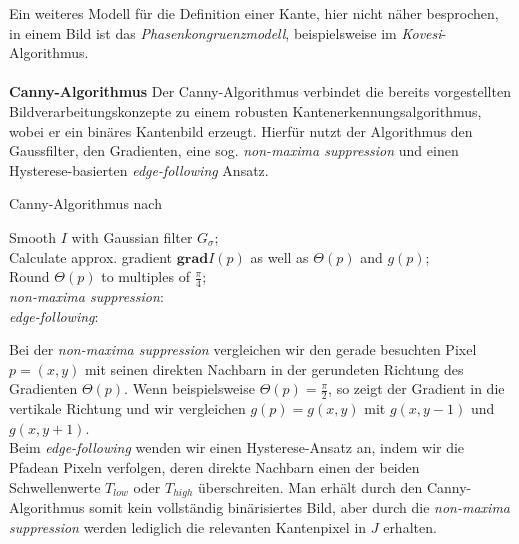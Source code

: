 Ein weiteres Modell für die Definition einer Kante, hier nicht näher besprochen, in einem Bild ist das \textit{Phasenkongruenzmodell}, beispielsweise im \textit{Kovesi}-Algorithmus\cite[S.\.79ff.]{Klette14}.
\\
\\
\textbf{Canny-Algorithmus} Der Canny-Algorithmus verbindet die bereits vorgestellten Bildverarbeitungskonzepte zu einem robusten Kantenerkennungsalgorithmus, wobei er ein binäres Kantenbild erzeugt. 
Hierfür nutzt der Algorithmus den Gaussfilter, den Gradienten, eine sog. \textit{non-maxima suppression} und einen Hysterese-basierten \textit{edge-following} Ansatz.
\newpage
\begin{algorithm}[htbp]
    \LinesNumbered
    \SetAlgoLined
    \caption{Canny-Algorithmus nach \cite[S.\. 64]{Klette14}}\label{alg:one}
    Smooth $I$ with Gaussian filter $G_\sigma$;\\
    Calculate approx. gradient $\mathbf{grad} I(p)$ as well as $\Theta(p)$ and $g(p)$;\\
    Round $\Theta(p)$ to multiples of $\frac{\pi}{4}$;\\
    \textit{non-maxima suppression}:\\
    \textit{edge-following}:\\
\end{algorithm}

\vspace{\baselineskip}
Bei der \textit{non-maxima suppression} vergleichen wir den gerade besuchten Pixel $p = (x,y)$ mit seinen direkten Nachbarn in der gerundeten Richtung des Gradienten $\Theta(p)$. Wenn beispielsweise $\Theta(p) = \frac{\pi}{2}$, so zeigt der Gradient in die vertikale Richtung und wir vergleichen $g(p) = g(x,y)$ mit $g(x, y-1)$ und $g(x,y+1)$.\\
Beim \textit{edge-following} wenden wir einen Hysterese-Ansatz an, indem wir die \dq Pfade\dq an Pixeln verfolgen, deren direkte Nachbarn einen der beiden Schwellenwerte $T_{low}$ oder $T_{high}$ überschreiten. Man erhält durch den Canny-Algorithmus somit kein vollständig binärisiertes Bild, aber durch die \textit{non-maxima suppression} werden lediglich die relevanten Kantenpixel in $J$ erhalten\cite[S.\. 64]{Klette14}.\\

